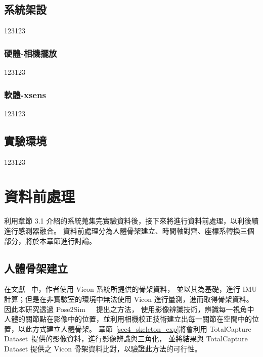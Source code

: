 \subsection{系統架設}
123123
\subsubsection{硬體-相機擺放}
123123
\subsubsection{軟體-xsens}
123123

\subsection{實驗環境}
123123

\section{資料前處理}
利用章節 3.1 介紹的系統蒐集完實驗資料後，接下來將進行資料前處理，以利後續進行感測器融合。
資料前處理分為人體骨架建立、時間軸對齊、座標系轉換三個部分，將於本章節進行討論。

\subsection{人體骨架建立}\label{sec3_skeleton_method}
在文獻~\cite{zhang2020fusing} 中，作者使用 Vicon 系統所提供的骨架資料，
並以其為基礎，進行 IMU 計算；但是在非實驗室的環境中無法使用 Vicon 進行量測，進而取得骨架資料。
因此本研究透過 Pose2Sim~\cite{Pagnon_2021_Robustness}~\cite{Pagnon_2022_Accuracy}~\cite{Pagnon_2022_JOSS}提出之方法，
使用影像辨識技術，辨識每一視角中人體的關節點在影像中的位置，並利用相機校正技術建立出每一關節在空間中的位置，以此方式建立人體骨架。
章節~\ref{sec4_skeleton_exp}將會利用 TotalCapture Dataset~\cite{Trumble:BMVC:2017}提供的影像資料，進行影像辨識與三角化，
並將結果與 TotalCapture Dataset 提供之 Vicon 骨架資料比對，以驗證此方法的可行性。

